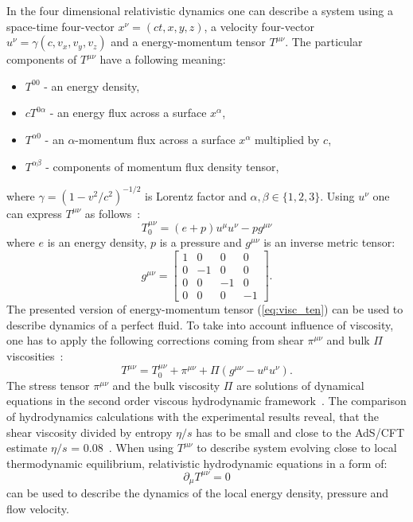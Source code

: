     In the four dimensional relativistic dynamics one can describe a system using a space-time four-vector $x^\nu=(ct,x,y,z)$, a velocity four-vector $u^\nu=\gamma(c,v_x,v_y,v_z)$ and a energy-momentum tensor $T^{\mu\nu}$.
    The particular components of $T^{\mu\nu}$ have a following meaning:
    \begin{itemize}
      \item $T^{00}$ - an energy density,
      \item $c T^{0\alpha}$ - an energy flux across a surface $x^\alpha$,
      \item $T^{\alpha0}$ - an $\alpha$-momentum flux across a surface  $x^\alpha$ multiplied by $c$,
      \item $T^{\alpha\beta}$ - components of momentum flux density tensor,
    \end{itemize}
    where $\gamma = (1-v^2/c^2)^{-1/2}$ is Lorentz factor and $\alpha,\beta \in \{1,2,3\}$.
    Using $u^\nu$ one can express $T^{\mu\nu}$ as follows~\cite{israel}:
    \begin{equation}
      \label{eq:visc_ten}
      T^{\mu\nu}_0 = (e+p)u^\mu u^\nu - pg^{\mu\nu}
    \end{equation}
    where $e$ is an energy density, $p$ is a pressure and $g^{\mu\nu}$ is an inverse metric tensor:
    \begin{equation}
      g^{\mu\nu} = 
      \begin{bmatrix}
        1 & 0 & 0 & 0 \\
        0 & -1 & 0 & 0 \\
        0 & 0 & -1 & 0 \\
        0 & 0 & 0 & -1
      \end{bmatrix} .
    \end{equation}
    The presented version of energy-momentum tensor (\ref{eq:visc_ten}) can be used to describe dynamics of a perfect fluid.
    To take into account influence of viscosity, one has to apply the following corrections coming from shear $\pi^{\mu\nu}$ and bulk $\Pi$ viscosities~\cite{visc_hydro}:
    \begin{equation}
      T^{\mu\nu} = T_0^{\mu\nu} + \pi^{\mu\nu} + \Pi(g^{\mu\nu}-u^{\mu}u^{\nu}) .
    \end{equation}
    The stress tensor $\pi^{\mu\nu}$ and the bulk viscosity $\Pi$ are solutions of dynamical equations in the second order viscous hydrodynamic framework~\cite{israel}.
    The comparison of hydrodynamics calculations with the experimental results reveal, that the shear viscosity divided by entropy $\eta / s$ has to be small and close to the AdS/CFT estimate $\eta /s$ = 0.08~\cite{visc_hydro,adscft}.
    When using $T^{\mu\nu}$ to describe system evolving close to local thermodynamic equilibrium, relativistic hydrodynamic equations in a form of:
    \begin{equation}
      \partial_{\mu} T^{\mu\nu} = 0
    \end{equation}
    can be used to describe the dynamics of the local energy density, pressure and flow velocity.

